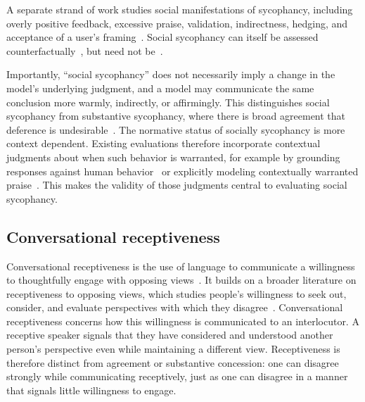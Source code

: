 \documentclass[letterpaper]{article} %
\begin{document}
A separate strand of work studies social manifestations of sycophancy, including overly positive feedback, excessive praise, validation, indirectness, hedging, and acceptance of a user's framing~\citep{sharma_towards_2025,cheng_elephant_2026, du_alignment_2025, vennemeyer_sycophancy_2026,vennemeyer_sycophantic_2026}. Social sycophancy can itself be assessed counterfactually~\citep[e.g., ``positivity'' as in][]{sharma_towards_2025}, but need not be~\citep[e.g.,][]{cheng_elephant_2026, vennemeyer_sycophantic_2026}. 

Importantly, ``social sycophancy'' does not necessarily imply a change in the model's underlying judgment, and a model may communicate the same conclusion more warmly, indirectly, or affirmingly. This distinguishes social sycophancy from substantive sycophancy, where there is broad agreement that deference is undesirable~\citep{ye_what_2026}. The normative status of socially sycophancy is more context dependent. Existing evaluations therefore incorporate contextual judgments about when such behavior is warranted, for example by grounding responses against human behavior~\citep{cheng_elephant_2026} or explicitly modeling contextually warranted praise~\citep{vennemeyer_sycophantic_2026}. This makes the validity of those judgments central to evaluating social sycophancy.

\subsection{Conversational receptiveness}

Conversational receptiveness is the use of language to communicate a willingness to thoughtfully engage with opposing views~\citep{yeomans_conversational_2020}. It builds on a broader literature on receptiveness to opposing views, which studies people's willingness to seek out, consider, and evaluate perspectives with which they disagree~\cite{chen_tell_2010,minson_why_2020,minson_receptiveness_2022}. Conversational receptiveness concerns how this willingness is communicated to an interlocutor. A receptive speaker signals that they have considered and understood another person's perspective even while maintaining a different view. Receptiveness is therefore distinct from agreement or substantive concession: one can disagree strongly while communicating receptively, just as one can disagree in a manner that signals little willingness to engage.
\end{document}
